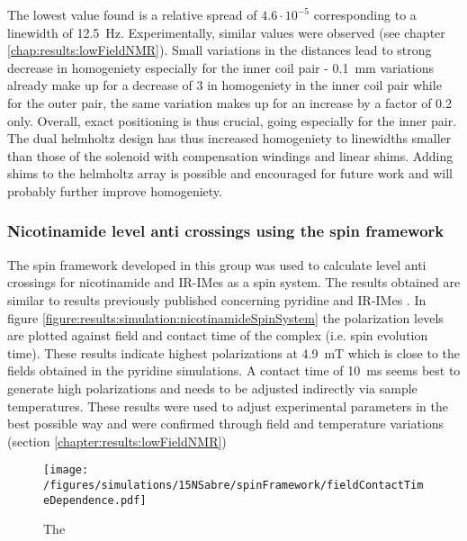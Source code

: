         The lowest value found is a relative spread of $4.6 \cdot 10^{-5}$ corresponding to a linewidth of \SI{12.5}{\hertz}. Experimentally, similar values were observed (see chapter \ref{chap:results:lowFieldNMR}). Small variations in the distances lead to strong decrease in homogeniety especially for the inner coil pair - \SI{0.1}{\milli\meter} variations already make up for a decrease of 3 in homogeniety in the inner coil pair while for the outer pair, the same variation makes up for an increase by a factor of 0.2 only. Overall, exact positioning is thus crucial, going especially for the inner pair. The dual helmholtz design has thus increased homogeniety to linewidths smaller than those of the solenoid with compensation windings and linear shims. Adding shims to the helmholtz array is possible and encouraged for future work and will probably further improve homogeniety.
        \subsubsection{Nicotinamide level anti crossings using the spin framework}
        The spin framework developed in this group  was used to calculate level anti crossings for nicotinamide and IR-IMes as a spin system. The results obtained are similar to results previously published concerning pyridine and IR-IMes . In figure \ref{figure:results:simulation:nicotinamideSpinSystem} the polarization levels are plotted against field and contact time of the complex (i.e. spin evolution time). These results indicate highest polarizations at \SI{4.9}{\milli\tesla} which is close to the fields obtained in the pyridine simulations. A contact time of \SI{10}{\milli\second} seems best to generate high polarizations and needs to be adjusted indirectly via sample temperatures. These results were used to adjust experimental parameters in the best possible way and were confirmed through field and temperature variations (section \ref{chapter:results:lowFieldNMR})
        \begin{figure}
            \texttt{[image: /figures/simulations/15NSabre/spinFramework/fieldContactTimeDependence.pdf]}
            \caption[Spin density matrix calculations]{The }
        \end{figure}
